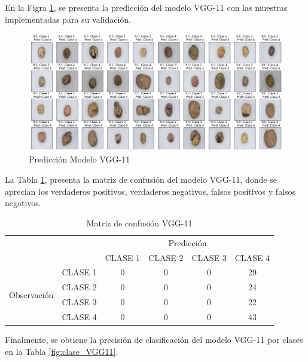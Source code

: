 En la Figra \ref{fig:Pre_VGG11}, se presenta la predicción del modelo VGG-11 con las muestras implementadas para su validación.

\begin{figure}[ht]
	\centering
	\includegraphics[scale=0.4]{Figs/107.png}
	\caption{Predicción Modelo VGG-11}
	\label{fig:Pre_VGG11}
\end{figure}

La Tabla \ref{fig:MC_VGG11}, presenta la matriz de confusión del modelo VGG-11, donde se aprecian los verdaderos positivos, verdaderos negativos, falsos positivos y falsos negativos.

\newpage
\begin{table}[htbp]
	\centering
	\begin{tabular}{|c|l|c|c|c|c|}
		\hline
		\multicolumn{2}{|c|}{\multirow{2}[4]{*}{}} & \multicolumn{4}{c|}{Predicción} \bigstrut\\
		\cline{3-6}    \multicolumn{2}{|c|}{} & CLASE 1 & CLASE 2 & CLASE 3 & CLASE 4 \bigstrut\\
		\hline
		\multirow{4}[8]{*}{\begin{sideways}Observación\end{sideways}} & CLASE 1 & 0     & 0     & 0    & 29 \bigstrut\\
		\cline{2-6}     & CLASE 2 & 0     & 0     & 0    & 24 \bigstrut\\
		\cline{2-6}      & CLASE 3 & 0     & 0     & 0    & 22 \bigstrut\\
		\cline{2-6}     & CLASE 4 & 0     & 0     & 0    & 43 \bigstrut\\
		\hline
	\end{tabular}%
	\caption{Matriz de confusión VGG-11}
	\label{fig:MC_VGG11}
\end{table}%

Finalmente, se obtiene la precisión de clasificación del modelo VGG-11 por clases en la Tabla \ref{fig:clase_VGG11}.

